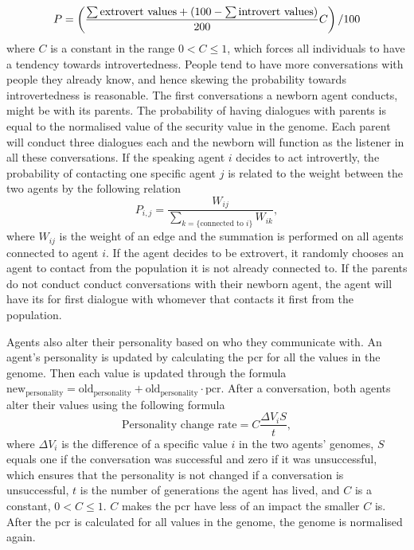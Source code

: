 \begin{equation}\label{eq:chooseListener}
P = \left( \frac{\sum \text{extrovert values} + (100 - \sum \text{introvert values})}{200}C \right)/100
\end{equation}
where $C$ is a constant in the range $0 < C \leq 1$, which forces all individuals to have a tendency towards introvertedness. People tend to have more conversations with people they already know, and hence skewing the probability towards introvertedness is reasonable. The first conversations a newborn agent conducts, might be with its parents. The probability of having dialogues with parents is equal to the normalised value of the security value in the genome. Each parent will conduct three dialogues each and the newborn will function as the listener in all these conversations. If the speaking agent $i$ decides to act introvertly, the probability of contacting one specific agent $j$ is related to the weight between the two agents by the following relation
\begin{equation}\label{eq:intrvertListener}
P_{i,j} = \frac{W_{ij}}{\sum_{k=\{\text{connected to } i\}} {W_{ik}}},
\end{equation}
where $W_{ij}$ is the weight of an edge and the summation is performed on all agents connected to agent $i$. If the agent decides to be extrovert, it randomly chooses an agent to contact from the population it is not already connected to. If the parents do not conduct conduct conversations with their newborn agent, the agent will have its for first dialogue with whomever that contacts it first from the population.

Agents also alter their personality based on who they communicate with. An agent's personality is updated by calculating the \ac{pcr} for all the values in the genome. Then each value is updated through the formula $\mathrm{new_{personality}} = \mathrm{old_{personality}} + \mathrm{old_{personality}} \cdot \mathrm{pcr}$. After a conversation, both agents alter their values using the following formula
\begin{equation}\label{eq:PCR}
\text{Personality change rate} = C\frac{\Delta V_i S}{t},
\end{equation}
where $\Delta V_i$ is the difference of a specific value $i$ in the two agents' genomes, $S$ equals one if the conversation was successful and zero if it was unsuccessful, which ensures that the personality is not changed if a conversation is unsuccessful, $t$ is the number of generations the agent has lived, and $C$ is a constant, $0 < C \leq 1$. $C$ makes the \ac{pcr} have less of an impact the smaller $C$ is. After the \ac{pcr} is calculated for all values in the genome, the genome is normalised again.

